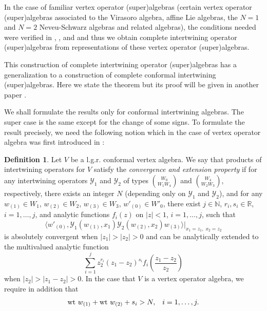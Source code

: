\documentclass{amsproc}
\theoremstyle{definition}
\newtheorem{defn}[thm]{Definition}
\theoremstyle{remark}
\newcommand{\wt}{\mbox{\rm wt}\ }
\newcommand{\lbar}{\bigg\vert}
\numberwithin{equation}{section}
\begin{document}
In the case of familiar vertex operator (super)algebras (certain 
vertex
operator (super)algebras associated to the Virasoro algebra, affine Lie
algebras, the $N=1$ and $N=2$ Neveu-Schwarz algebras and related algebras), 
the conditions needed were verified in \cite{H3},
\cite{HL5}, \cite{HM1} and \cite{HM2} and
thus we obtain complete intertwining operator (super)algebras from
representations of these vertex operator (super)algebras.


This construction of complete intertwining operator (super)algebras
has a generalization to a construction of complete conformal intertwining 
(super)algebras. Here we state the theorem but its proof will be 
given in another paper \cite{H7}.


We shall formulate the results only for conformal intertwining algebras.
The super case is the same except for the change of some signs.
To formulate the result precisely, we need 
the following notion which 
in the case of 
vertex operator algebra was first introduced in \cite{H1}:

\begin{defn}
{\rm Let $V$ be a l.g.r. conformal
vertex algebra. We say that  products of
intertwining operators
for $V$ satisfy the {\it
convergence and extension property} 
if for any intertwining operators
$\mathcal{Y}_{1}$ and $\mathcal{Y}_{2}$ of types
$\binom{W_{0}}{W_{1}W_{4}}$ and $\binom{W_{4}}
{W_{2}W_{3}}$, respectively,
there exists 
an integer $N$
(depending only on $\mathcal{Y}_{1}$ and $\mathcal{Y}_{2}$), and 
for any $w_{(1)}\in W_{1}$,
$w_{(2)}\in W_{2}$, $w_{(3)}\in W_{3}$, $w'_{(0)}\in W'_{0}$, there exist
$j\in \mathbb{N}$, $r_{i}, s_{i}\in \mathbb{R}$, $i=1, \dots, j$, and analytic 
functions $f_{i}(z)$ on $|z|<1$, $i=1, \dots, j$, 
such that
$$%
\langle w'_{(0)}, \mathcal{Y}_{1}(w_{(1)}, x_{1})
\mathcal{Y}_{2}(w_{(2)}, x_{2})w_{(3)}\rangle
\lbar_{x_{1}= z_{1}, \;x_{2}=z_{2}}
$$%
is absolutely 
convergent when $|z_{1}|>|z_{2}|>0$ and can be analytically extended to  
the multivalued analytic function
$$%
\sum_{i=1}^{j}z_{2}^{r_{i}}(z_{1}-z_{2})^{s_{i}}
f_{i}\left(\frac{z_{1}-z_{2}}{z_{2}}\right)
$$%
when $|z_{2}|>|z_{1}-z_{2}|>0$. In the case that 
$V$ is a vertex operator algebra, we  require in addition that
\begin{equation}\label{si}
\wt w_{(1)}+\wt w_{(2)}+s_{i}>N,\;\;\;i=1, \dots, j.
\end{equation}}
\end{defn}
\end{document}
